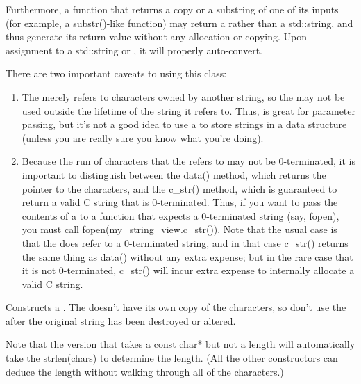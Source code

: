Furthermore, a function that returns a copy or a substring of one of its
inputs (for example, a {\cf substr()}-like function) may return a \stringview
rather than a {\cf std::string}, and thus generate its return value without
any allocation or copying. Upon assignment to a {\cf std::string} or \ustring,
it will properly auto-convert.

There are two important caveats to using this class:
\begin{enumerate}
\item The \stringview merely refers to characters owned by another string,
   so the \stringview may not be used outside the lifetime of the string
   it refers to. Thus, \stringview is great for parameter passing, but
   it's not a good idea to use a \stringview to store strings in a data
   structure (unless you are really sure you know what you're doing).
\item Because the run of characters that the \stringview refers to may not
   be 0-terminated, it is important to distinguish between the {\cf data()}
   method, which returns the pointer to the characters, and the {\cf c_str()}
   method, which is guaranteed to return a valid C string that is
   0-terminated. Thus, if you want to pass the contents of a \stringview
   to a function that expects a 0-terminated string (say, fopen), you
   must call {\cf fopen(my_string_view.c_str()}).  Note that the usual case
   is that the \stringview does refer to a 0-terminated string, and in
   that case c_str() returns the same thing as data() without any extra
   expense; but in the rare case that it is not 0-terminated, c_str()
   will incur extra expense to internally allocate a valid C string.
\end{enumerate}

Constructs a \stringview.  The \stringview doesn't have its own copy of the
characters, so don't use the \stringview after the original string has been
destroyed or altered.

Note that the version that takes a {\cf const char*} but not a length will
automatically take the {\cf strlen(chars)} to determine the length.  (All
the other constructors can deduce the length without walking through all
of the characters.)
\apiend

